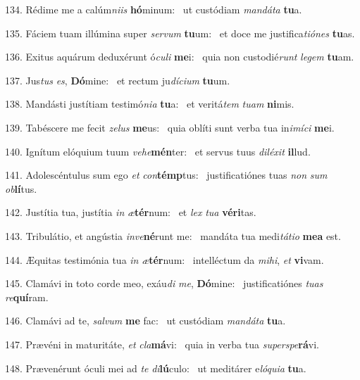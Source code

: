 134. Rédime me a calúm\textit{ni}\textit{is} \textbf{hó}minum: \ast\  ut custódiam \textit{man}\textit{dá}\textit{ta} \textbf{tu}a.\

135. Fáciem tuam illúmina super \textit{ser}\textit{vum} \textbf{tu}um: \ast\  et doce me justifica\textit{ti}\textit{ó}\textit{nes} \textbf{tu}as.\

136. Exitus aquárum deduxérunt ó\textit{cu}\textit{li} \textbf{me}i: \ast\  quia non custodié\textit{runt} \textit{le}\textit{gem} \textbf{tu}am.\

137. Jus\textit{tus} \textit{es}, \textbf{Dó}mine: \ast\  et rectum ju\textit{dí}\textit{ci}\textit{um} \textbf{tu}um.\

138. Mandásti justítiam testimó\textit{ni}\textit{a} \textbf{tu}a: \ast\  et veritá\textit{tem} \textit{tu}\textit{am} \textbf{ni}mis.\

139. Tabéscere me fecit \textit{ze}\textit{lus} \textbf{me}us: \ast\  quia oblíti sunt verba tua in\textit{i}\textit{mí}\textit{ci} \textbf{me}i.\

140. Ignítum elóquium tuum \textit{ve}\textit{he}\textbf{mén}ter: \ast\  et servus tuus \textit{di}\textit{lé}\textit{xit} \textbf{il}lud.\

141. Adolescéntulus sum ego \textit{et} \textit{con}\textbf{témp}tus: \ast\  justificatiónes tuas \textit{non} \textit{sum} \textit{ob}\textbf{lí}tus.\

142. Justítia tua, justítia \textit{in} \textit{æ}\textbf{tér}num: \ast\  et \textit{lex} \textit{tu}\textit{a} \textbf{vé}\textbf{ri}tas.\

143. Tribulátio, et angústia \textit{in}\textit{ve}\textbf{né}runt me: \ast\  mandáta tua medi\textit{tá}\textit{ti}\textit{o} \textbf{me}\textbf{a} est.\

144. Æquitas testimónia tua \textit{in} \textit{æ}\textbf{tér}num: \ast\  intelléctum da \textit{mi}\textit{hi}, \textit{et} \textbf{vi}vam.\

145. Clamávi in toto corde meo, exáu\textit{di} \textit{me}, \textbf{Dó}mine: \ast\  justificatiónes \textit{tu}\textit{as} \textit{re}\textbf{quí}ram.\

146. Clamávi ad te, \textit{sal}\textit{vum} \textbf{me} fac: \ast\  ut custódiam \textit{man}\textit{dá}\textit{ta} \textbf{tu}a.\

147. Prævéni in maturitáte, \textit{et} \textit{cla}\textbf{má}vi: \ast\  quia in verba tua \textit{su}\textit{per}\textit{spe}\textbf{rá}vi.\

148. Prævenérunt óculi mei ad \textit{te} \textit{di}\textbf{lú}culo: \ast\  ut meditárer e\textit{ló}\textit{qui}\textit{a} \textbf{tu}a.\

